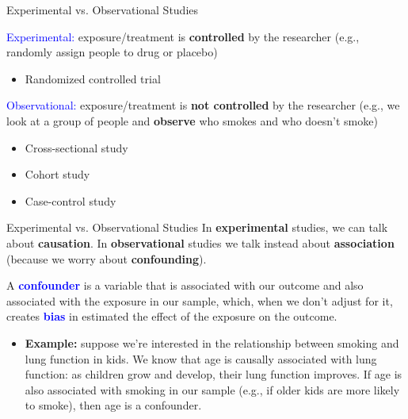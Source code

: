 \documentclass[10pt,t]{beamer}
\begin{document}
\begin{frame}{Experimental vs. Observational Studies}

\textcolor{blue}{Experimental:} exposure/treatment is \textbf{controlled} by the researcher (e.g., randomly assign people to drug or placebo)
\begin{itemize}
	\item Randomized controlled trial 
\end{itemize}

\vspace{0.3cm}

\textcolor{blue}{Observational:} exposure/treatment is \textbf{not controlled} by the researcher (e.g., we look at a group of people and \textbf{observe} who smokes and who doesn't smoke)
\begin{itemize}
	\item Cross-sectional study
	\item Cohort study
	\item Case-control study
\end{itemize}
\end{frame}
	
	
\begin{frame}{Experimental vs. Observational Studies}
In \textbf{experimental} studies, we can talk about \color{blue} \textbf{causation}\color{black}. In \textbf{observational} studies we  talk instead about \color{blue} \textbf{association} \color{black}(because we worry about \color{blue} \textbf{confounding}\color{black}). \\

\vspace{0.3cm}

A \textbf{\textcolor{blue}{confounder}} is a variable that is associated with our outcome and also associated with the exposure in our sample, which, when we don't adjust for it, creates \textbf{\textcolor{blue}{bias}} in estimated the effect of the exposure on the outcome.  \\

\vspace{0.3cm}

\begin{itemize}
	\item[] \textbf{Example:} suppose we're interested in the relationship between smoking and lung function in kids. We know that age is causally associated with lung function: as children grow and develop, their lung function improves. If age is also associated with smoking in our sample (e.g., if older kids are more likely to smoke), then age is a confounder.
\end{itemize} 


\end{frame}
\end{document}
